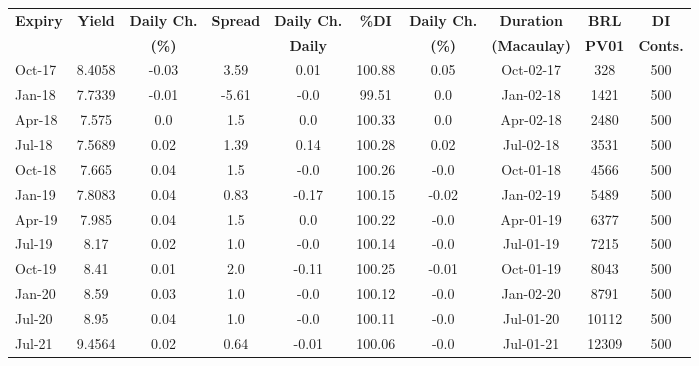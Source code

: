 \documentclass[article,crop=false]{standalone}%
\begin{document}
%
\normalsize%
\setlength{\tabcolsep}{0.15cm}%
\begin{tabular}[h]{l|c c|c c|c c|c c c}%
\hline%
\rowcolor{white}%
\textbf{Expiry}&\textbf{Yield}&\textbf{Daily Ch.}&\textbf{Spread}&\textbf{Daily Ch.}&\textbf{\%DI}&\textbf{Daily Ch.}&\textbf{Duration}&\textbf{BRL}&\textbf{DI}\\%
\rowcolor{white}%
\textbf{}&\textbf{}&\textbf{(\%)}&\textbf{}&\textbf{Daily}&\textbf{}&\textbf{(\%)}&\textbf{(Macaulay)}&\textbf{PV01}&\textbf{Conts.}\\%
\hline%
\rowcolor{lightgray}%
Oct{-}17&8.4058&{-}0.03&3.59&0.01&100.88&0.05&Oct{-}02{-}17&328&500\\%
\rowcolor{white}%
Jan{-}18&7.7339&{-}0.01&{-}5.61&{-}0.0&99.51&0.0&Jan{-}02{-}18&1421&500\\%
\rowcolor{lightgray}%
Apr{-}18&7.575&0.0&1.5&0.0&100.33&0.0&Apr{-}02{-}18&2480&500\\%
\rowcolor{white}%
Jul{-}18&7.5689&0.02&1.39&0.14&100.28&0.02&Jul{-}02{-}18&3531&500\\%
\rowcolor{lightgray}%
Oct{-}18&7.665&0.04&1.5&{-}0.0&100.26&{-}0.0&Oct{-}01{-}18&4566&500\\%
\rowcolor{white}%
Jan{-}19&7.8083&0.04&0.83&{-}0.17&100.15&{-}0.02&Jan{-}02{-}19&5489&500\\%
\rowcolor{lightgray}%
Apr{-}19&7.985&0.04&1.5&0.0&100.22&{-}0.0&Apr{-}01{-}19&6377&500\\%
\rowcolor{white}%
Jul{-}19&8.17&0.02&1.0&{-}0.0&100.14&{-}0.0&Jul{-}01{-}19&7215&500\\%
\rowcolor{lightgray}%
Oct{-}19&8.41&0.01&2.0&{-}0.11&100.25&{-}0.01&Oct{-}01{-}19&8043&500\\%
\rowcolor{white}%
Jan{-}20&8.59&0.03&1.0&{-}0.0&100.12&{-}0.0&Jan{-}02{-}20&8791&500\\%
\rowcolor{lightgray}%
Jul{-}20&8.95&0.04&1.0&{-}0.0&100.11&{-}0.0&Jul{-}01{-}20&10112&500\\%
\rowcolor{white}%
Jul{-}21&9.4564&0.02&0.64&{-}0.01&100.06&{-}0.0&Jul{-}01{-}21&12309&500\\%
\hline%
\end{tabular}%
\end{document}

